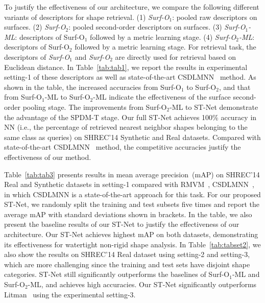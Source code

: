 \documentclass[runningheads]{llncs}
\begin{document}
To justify the effectiveness of our architecture, we compare the following different variants of descriptors for shape retrieval. (1) \emph{Surf-O$_1$}:  pooled raw descriptors on surfaces. (2) \emph{Surf-O$_2$}:  pooled  second-order descriptors on surfaces. (3) \emph{Surf-O$_1$-ML}:  descriptors of Surf-O$_1$ followed by a metric learning stage. (4)  \emph{Surf-O$_2$-ML}: descriptors of Surf-O$_2$ followed by a metric learning stage.
For retrieval task, the descriptors of \emph{Surf-O$_1$} and \emph{Surf-O$_2$} are directly used for retrieval based on Euclidean distance. 
In Table~\ref{tab:tab1}, we report the results in experimental setting-1 of these descriptors as well as state-of-the-art CSDLMNN~\cite{Ioannis} method. As shown in the table, the increased accuracies from Surf-O$_1$ to Surf-O$_2$, and that from  Surf-O$_1$-ML to Surf-O$_2$-ML indicate the effectiveness of the surface second-order pooling stage. The improvements from Surf-O$_2$-ML to ST-Net demonstrate the advantage of the SPDM-T stage.  Our full ST-Net achieves 100\% accuracy in NN (i.e., the percentage of retrieved nearest neighbor shapes belonging to the same class as queries) on SHREC'14 Synthetic and Real datasets. Compared with state-of-the-art CSDLMNN~\cite{Ioannis} method, the competitive accuracies justify the effectiveness of our method. 

Table~\ref{tab:tab3} presents results in mean average precision~(mAP) on SHREC'14 Real and Synthetic datasets in setting-1 compared with RMVM~\cite{RMVM}, CSDLMNN~\cite{Ioannis}, in which CSDLMNN is a state-of-the-art approach for this task. For our proposed ST-Net, we randomly split the training and test subsets five times and report the average mAP with standard deviations shown in brackets. In the table, we also present the baseline results of our ST-Net to justify the effectiveness of our architecture. Our ST-Net achieves highest mAP on both datasets, demonstrating its effectiveness for watertight non-rigid shape analysis.
In Table~\ref{tab:tabset2}, we also show the results on  SHREC'14 Real dataset using setting-2  and  setting-3, which are more challenging since the training and test sets have disjoint shape categories.  ST-Net still significantly outperforms the baselines of Surf-O$_1$-ML and Surf-O$_2$-ML, and achieves high accuracies. Our ST-Net significantly outperforms Litman~\cite{SHREC} using the experimental setting-3.
\end{document}
